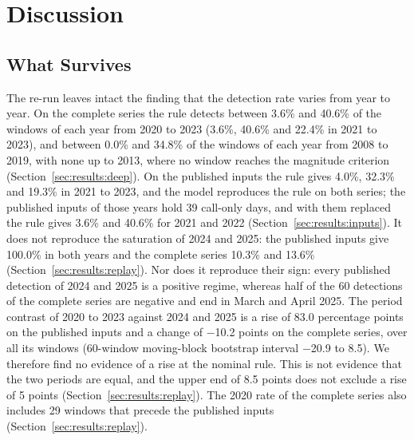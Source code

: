 \section{Discussion}
\label{sec:discussion}

\subsection{What Survives}
\label{sec:discussion:survives}

The re-run leaves intact the finding that the detection rate varies from year to year. On the complete series the rule detects between 3.6\% and 40.6\% of the windows of each year from 2020 to 2023 (3.6\%, 40.6\% and 22.4\% in 2021 to 2023), and between 0.0\% and 34.8\% of the windows of each year from 2008 to 2019, with none up to 2013, where no window reaches the magnitude criterion (Section~\ref{sec:results:deep}). On the published inputs the rule gives 4.0\%, 32.3\% and 19.3\% in 2021 to 2023, and the model reproduces the rule on both series; the published inputs of those years hold 39 call-only days, and with them replaced the rule gives 3.6\% and 40.6\% for 2021 and 2022 (Section~\ref{sec:results:inputs}). It does not reproduce the saturation of 2024 and 2025: the published inputs give 100.0\% in both years and the complete series 10.3\% and 13.6\% (Section~\ref{sec:results:replay}). Nor does it reproduce their sign: every published detection of 2024 and 2025 is a positive regime, whereas half of the 60 detections of the complete series are negative and end in March and April 2025. The period contrast of 2020 to 2023 against 2024 and 2025 is a rise of 83.0 percentage points on the published inputs and a change of $-$10.2 points on the complete series, over all its windows (60-window moving-block bootstrap interval $-$20.9 to 8.5). We therefore find no evidence of a rise at the nominal rule. This is not evidence that the two periods are equal, and the upper end of 8.5 points does not exclude a rise of 5 points (Section~\ref{sec:results:replay}). The 2020 rate of the complete series also includes 29 windows that precede the published inputs (Section~\ref{sec:results:replay}).
